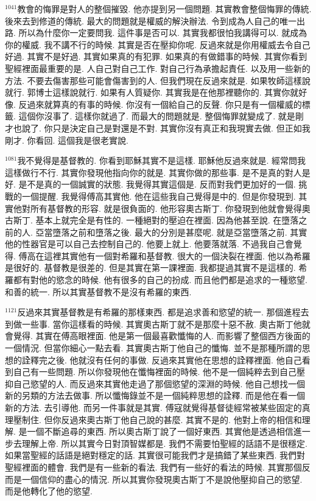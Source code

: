 \documentclass{book}
\begin{document}
$^{1041}$教會的悔罪是對人的整個摧毀.
他亦提到另一個問題.
其實教會整個悔罪的傳統.
後來去到修道的傳統.
最大的問題就是權威的解決辦法.
令到成為人自己的唯一出路.
所以為什麼你一定要問我.
這件事是否可以.
其實我都很怕我講得可以.
就成為你的權威.
我不講不行的時候.
其實是否在壓抑你呢.
反過來就是你用權威去令自己好過.
其實不是好過.
其實如果真的有犯罪.
如果真的有做錯事的時候.
其實你看到聖經裡面最重要的是.
人自己對自己工作.
對自己行為承擔起責任.
以及用一些新的方法.
不要去傷害那些可能會傷害到的人.
但我們現在反過來就是.
如果牧師這樣說就行.
郭博士這樣說就行.
如果有人質疑你.
其實我是在他那裡聽你的.
其實你就好像.
反過來就算真的有事的時候.
你沒有一個給自己的反聲.
你只是有一個權威的標籤.
這個你沒事了.
這樣你就過了.
而最大的問題就是.
整個悔罪就變成了.
就是剛才也說了.
你只是決定自己是對還是不對.
其實你沒有真正和我現實去做.
但正如我剛才.
你看回.
這個我是很老實說.

$^{1081}$我不覺得是基督教的.
你看到耶穌其實不是這樣.
耶穌他反過來就是.
經常問我這樣做行不行.
其實你發現他指向你的就是.
其實你做的那些事.
是不是真的對人是好.
是不是真的一個誠實的狀態.
我覺得其實這個是.
反而對我們更加好的一個.
挑戰的一個提醒.
我覺得傅高其實他.
他在這些我自己覺得是中的.
但是你發現到.
其實他對所有基督教的形容.
就是很負面的.
他形容奧古斯丁.
你發現到他就會覺得奧古斯丁.
基本上就完全是有性的.
一種絕對的壓迫在裡面.
因為他甚至說.
在墮落之前的人.
亞當墮落之前和墮落之後.
最大的分別是甚麼呢.
就是亞當墮落之前.
其實他的性器官是可以自己去控制自己的.
他要上就上.
他要落就落.
不過我自己會覺得.
傅高在這裡其實他有一個對希羅和基督教.
很大的一個決裂在裡面.
他以為希羅是很好的.
基督教是很差的.
但是其實在第一課裡面.
我都提過其實不是這樣的.
希羅都有對他的慾念的時候.
他有很多的自己的扮成.
而且他們都是追求的一種慾望.
和善的統一.
所以其實基督教不是沒有希羅的東西.

$^{1121}$反過來其實基督教是有希羅的那樣東西.
都是追求善和慾望的統一.
那個進程去到做一些事.
當你這樣看的時候.
其實奧古斯丁就不是那麼十惡不赦.
奧古斯丁他就會覺得.
其實在傅高眼裡面.
他是第一個最喜歡懺悔的人.
而影響了整個西方後面的一個情況.
但當你細心一點去看.
其實奧古斯丁他自己的懺悔.
並不是那種所謂的思想的詮釋完之後.
他就沒有任何的事做.
反過來其實他在思想的詮釋裡面.
他自己看到自己有一些問題.
所以你發現他在懺悔裡面的時候.
他不是一個純粹去到自己壓抑自己慾望的人.
而反過來其實他走過了那個慾望的深淵的時候.
他自己想找一個新的另類的方法去做事.
所以懺悔錄並不是一個純粹思想的詮釋.
而是他在看一個新的方法.
去引導他.
而另一件事就是其實.
傅寇就覺得基督徒經常被某些固定的真理壓制住.
但你反過來奧古斯丁他自己說的甚麼.
其實不是的.
他對上帝的相信和理解.
是一個不斷追尋的東西.
所以奧古斯丁說了一個好東西.
其實他是透過相信進一步去理解上帝.
所以其實今日對頂智媒都是.
我們不需要怕聖經的話語不是很穩定.
如果當聖經的話語是絕對穩定的話.
其實很可能我們才是搞錯了某些東西.
我們對聖經裡面的體會.
我們是有一些新的看法.
我們有一些好的看法的時候.
其實那個反而是一個信仰的盡心的情況.
所以其實你發現奧古斯丁不是說他壓抑自己的慾望.
而是他轉化了他的慾望.
\end{document}
